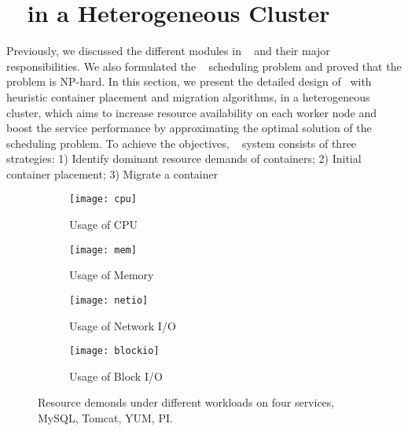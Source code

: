 \section{\sol~ in a Heterogeneous Cluster}
Previously, we discussed the different modules in \sol~ and their major responsibilities. We also formulated the \sol~ scheduling problem and proved that the problem is NP-hard.
In this section, we present the detailed design of \sol~with heuristic container placement and migration algorithms, in a heterogeneous cluster,
which aims to increase resource availability on each worker node and boost the service performance by  approximating the optimal solution of the \sol~ scheduling problem.
To achieve the objectives, \sol~ system consists of three strategies:
1) Identify dominant resource demands of containers;
2) Initial container placement;
3) Migrate a container




\begin{figure*}[ht]
   \centering
      \begin{subfigure}[t]{0.24\linewidth}
\centering
      \texttt{[image: cpu]}
      \vspace{-0.15in}
      \caption{Usage of CPU}
      \label{fig:cpu}
      \end{subfigure} %
      \begin{subfigure}[t]{0.24\linewidth}
\centering
      \texttt{[image: mem]}
      \vspace{-0.15in}
      \caption{Usage of Memory}
      \label{fig:mem}
      \end{subfigure} %
      \begin{subfigure}[t]{0.24\linewidth}
\centering
      \texttt{[image: netio]}
      \vspace{-0.15in}
      \caption{Usage of Network I/O}
      \label{fig:netio}
      \end{subfigure} %
      \begin{subfigure}[t]{0.24\linewidth}
\centering
      \texttt{[image: blockio]}
      \vspace{-0.15in}
      \caption{Usage of Block I/O}
      \label{fig:blockio}
      \end{subfigure} %
\caption{Resource demonds under different workloads on four services, MySQL, Tomcat, YUM, PI.}
\label{fig:understand}
\end{figure*}

